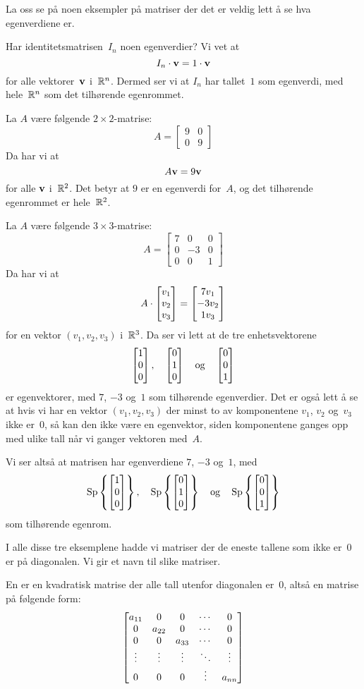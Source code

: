 La oss se på noen eksempler på matriser der det er veldig lett å se
hva egenverdiene er.

\begin{ex}
Har identitetsmatrisen~$I_n$ noen egenverdier?  Vi vet at
\[
I_n \cdot \mathbf{v} = 1 \cdot \mathbf{v}
\]
for alle vektorer~$\mathbf{v}$ i~$\mathbb{R}^n$.  Dermed ser vi at $I_n$ har
tallet~$1$ som egenverdi, med hele~$\mathbb{R}^n$ som det tilhørende
egenrommet.
\end{ex}

\begin{ex}
La $A$ være følgende $2 \times 2$-matrise:
\[
A =
\begin{bmatrix}
9 & 0 \\
0 & 9
\end{bmatrix}
\]
Da har vi at
\[
A \mathbf{v} = 9 \mathbf{v}
\]
for alle $\mathbf{v}$ i~$\mathbb{R}^2$.  Det betyr at $9$ er en egenverdi for~$A$,
og det tilhørende egenrommet er hele~$\mathbb{R}^2$.
\end{ex}

\begin{ex}
La $A$ være følgende $3 \times 3$-matrise:
\[
A =
\begin{bmatrix}
7 &  0 & 0 \\
0 & -3 & 0 \\
0 &  0 & 1
\end{bmatrix}
\]
Da har vi at
\[
A \cdot \begin{bmatrix} v_1 \\ v_2 \\ v_3 \end{bmatrix} = \begin{bmatrix} 7v_1 \\ -3v_2 \\ 1v_3 \end{bmatrix}
\]
for en vektor $(v_1,v_2,v_3)$ i~$\mathbb{R}^3$.  Da ser vi lett at de tre
enhetsvektorene
\[
\begin{bmatrix} 1 \\ 0 \\ 0 \end{bmatrix},\quad
\begin{bmatrix} 0 \\ 1 \\ 0 \end{bmatrix}\quad\text{og}\quad
\begin{bmatrix} 0 \\ 0 \\ 1 \end{bmatrix}
\]
er egenvektorer, med $7$, $-3$ og~$1$ som tilhørende egenverdier.  Det
er også lett å se at hvis vi har en vektor $(v_1,v_2,v_3)$ der minst
to av komponentene $v_1$, $v_2$ og~$v_3$ ikke er~$0$, så kan den ikke
være en egenvektor, siden komponentene ganges opp med ulike tall når
vi ganger vektoren med~$A$.

Vi ser altså at matrisen har egenverdiene $7$, $-3$ og~$1$, med
\[
\operatorname{Sp} \left\{ \begin{bmatrix} 1 \\ 0 \\ 0 \end{bmatrix} \right\},\quad
\operatorname{Sp} \left\{ \begin{bmatrix} 0 \\ 1 \\ 0 \end{bmatrix} \right\}\quad\text{og}\quad
\operatorname{Sp} \left\{ \begin{bmatrix} 0 \\ 0 \\ 1 \end{bmatrix} \right\}
\]
som tilhørende egenrom.
\end{ex}

I alle disse tre eksemplene hadde vi matriser der de eneste tallene
som ikke er~$0$ er på diagonalen.  Vi gir et navn til slike matriser.

\begin{defn}
En  er en kvadratisk matrise der alle tall
utenfor diagonalen er~$0$, altså en matrise på følgende form:
\[
\begin{bmatrix}
a_{11} & 0      & 0      & \cdots & 0      \\
0      & a_{22} & 0      & \cdots & 0      \\
0      & 0      & a_{33} & \cdots & 0      \\
\vdots & \vdots & \vdots & \ddots & \vdots \\
0      & 0      & 0      & \vdots & a_{nn}
\end{bmatrix}
\vspace{-17pt}
\]
\end{defn}

